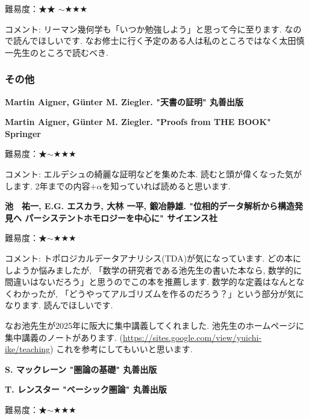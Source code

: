難易度：★★ $\sim$★★★\vspace{-6pt} 

コメント: リーマン幾何学も「いつか勉強しよう」と思って今に至ります. なので読んでほしいです. 
なお修士に行く予定のある人は私のところではなく太田慎一先生のところで読むべき.


\subsubsection{その他}

\textbf{Martin Aigner, G\"unter M. Ziegler. "天書の証明" 丸善出版}  　\vspace{-6pt} 

\textbf{Martin Aigner, G\"unter M. Ziegler. "Proofs from THE BOOK" Springer}  　\vspace{-6pt} 

難易度：★$\sim$★★★ 　\vspace{-6pt} 

コメント: エルデシュの綺麗な証明などを集めた本. 読むと頭が偉くなった気がします. 
2年までの内容$+\alpha$を知っていれば読めると思います.  
\vspace{8pt}

\textbf{池　祐一, E.G. エスカラ, 大林 一平, 鍛冶静雄. "位相的データ解析から構造発見へ パーシステントホモロジーを中心に" サイエンス社}  　\vspace{-6pt} 

難易度：★$\sim$★★★\vspace{-6pt} 

コメント: トポロジカルデータアナリシス(TDA)が気になっています. どの本にしようか悩みましたが, 「数学の研究者である池先生の書いた本なら, 数学的に間違いはないだろう」と思うのでこの本を推薦します. 数学的な定義はなんとなくわかったが, 「どうやってアルゴリズムを作るのだろう？」という部分が気になります. 読んでほしいです. 

なお池先生が2025年に阪大に集中講義してくれました. 池先生のホームページに集中講義のノートがあります. (\url{https://sites.google.com/view/yuichi-ike/teaching}) これを参考にしてもいいと思います. 
\vspace{8pt}

\textbf{S. マックレーン "圏論の基礎" 丸善出版}  　\vspace{-6pt} 

\textbf{T. レンスター "ベーシック圏論" 丸善出版}  　\vspace{-6pt} 

難易度：★$\sim$★★★ \vspace{-6pt} 

